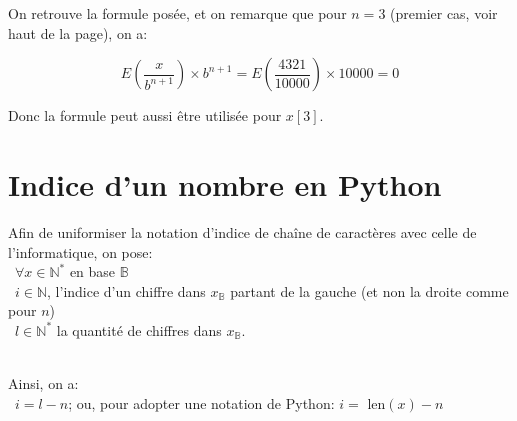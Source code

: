 \documentclass[a4paper, 12pt]{article}
\begin{document}
On retrouve la formule posée, et on remarque que pour $n = 3$ (premier cas, voir haut de la page), on a:

\begin{equation}
E \left( \frac{x}{b^{n+1}} \right) \times b^{n+1} = E \left( \frac{4321}{10000} \right) \times 10000 = 0
\end{equation}

Donc la formule peut aussi être utilisée pour $x[3]$.

\newpage
\section*{Indice d'un nombre en Python}
Afin de uniformiser la notation d'indice de chaîne de caractères avec celle de l'informatique, on pose: \\\
$\forall x \in \mathbb{N}^{*}$ en base $\mathbb{B}$ \\\
$i \in \mathbb{N}$, l'indice d'un chiffre dans $x_\mathbb{B}$ partant de la gauche (et non la droite comme pour $n$) \\\
$l \in \mathbb{N}^{*}$ la quantité de chiffres dans $x_\mathbb{B}$. \\\


Ainsi, on a: \\\
$i = l - n$; ou, pour adopter une notation de Python: $i = $ len$(x) - n$
\end{document}
